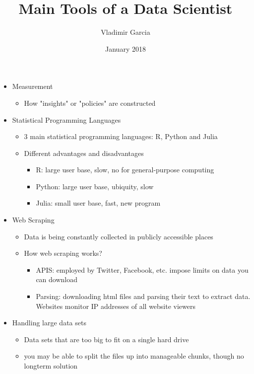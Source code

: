 \documentclass{article}
\title{Main Tools of a Data Scientist}
\author{Vladimir Garcia}
\date{January 2018}
\begin{document}
\maketitle

\begin{itemize}
\item Measurement
    \begin{itemize}
        \item How "insights" or "policies" are constructed
    \end{itemize}
\item Statistical Programming Languages
    \begin{itemize}
        \item 3 main statistical programming languages: R, Python and Julia
        \item Different advantages and disadvantages
        \begin{itemize}
            \item R: large user base, slow, no for general-purpose computing
            \item Python: large user base, ubiquity, slow
            \item Julia: small user base, fast, new program
        \end{itemize}
    \end{itemize}
\item Web Scraping
    \begin{itemize}
        \item Data is being constantly collected in publicly accessible places
        \item How web scraping works?
            \begin{itemize}
                \item APIS: employed by Twitter, Facebook, etc. impose limits on data you can download
                \item Parsing: downloading html files and parsing their text to extract data. Websites monitor IP addresses of all website viewers
            \end{itemize}
    \end{itemize}
\item Handling large data sets
    \begin{itemize}
        \item Data sets that are too big to fit on a single hard drive
        \item you may be able to split the files up into manageable chunks, though no longterm solution

\end{itemize}
\end{itemize}
\end{document}
